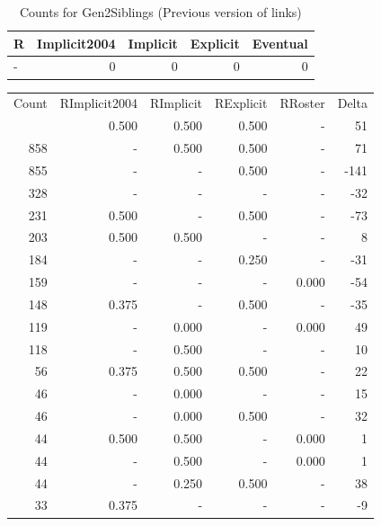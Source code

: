 \documentclass[a4paper]{article}\usepackage{graphicx, color}
\begin{document}
\begin{table}[ht]
\centering
{\large
\begin{tabular}{lrrrr}
  \hline
R & Implicit2004 & Implicit & Explicit & Eventual \\ 
  \hline
- &   0 &   0 &   0 &   0 \\ 
   \hline
\end{tabular}
}
\caption{Counts for Gen2Siblings (Previous version of links)} 
\end{table}



\begin{table}[ht]
\centering
\begin{tabular}{rrrrrr}
  \hline
Count & RImplicit2004 & RImplicit & RExplicit & RRoster & Delta \\ 
  \rowcolor{goodColor}  \hline
1243 & 0.500 & 0.500 & 0.500 & - & 51 \\ 
   \rowcolor{goodColor} 858 & - & 0.500 & 0.500 & - & 71 \\ 
   \rowcolor{sosoColor} 855 & - & - & 0.500 & - & -141 \\ 
   \rowcolor{nullColor} 328 & - & - & - & - & -32 \\ 
   \rowcolor{sosoColor} 231 & 0.500 & - & 0.500 & - & -73 \\ 
  203 & 0.500 & 0.500 & - & - & 8 \\ 
   \rowcolor{sosoColor} 184 & - & - & 0.250 & - & -31 \\ 
   \rowcolor{nullColor} 159 & - & - & - & 0.000 & -54 \\ 
   \rowcolor{sosoColor} 148 & 0.375 & - & 0.500 & - & -35 \\ 
  119 & - & 0.000 & - & 0.000 & 49 \\ 
  118 & - & 0.500 & - & - & 10 \\ 
   \rowcolor{goodColor} 56 & 0.375 & 0.500 & 0.500 & - & 22 \\ 
  46 & - & 0.000 & - & - & 15 \\ 
   \rowcolor{badColor} 46 & - & 0.000 & 0.500 & - & 32 \\ 
  44 & 0.500 & 0.500 & - & 0.000 & 1 \\ 
  44 & - & 0.500 & - & 0.000 & 1 \\ 
   \rowcolor{badColor} 44 & - & 0.250 & 0.500 & - & 38 \\ 
   \rowcolor{nullColor} 33 & 0.375 & - & - & - & -9 \\ 

\end{tabular}
\end{table}
\end{document}
